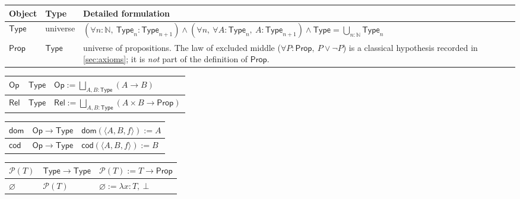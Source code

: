 \documentclass[11pt,reqno]{amsart}
\theoremstyle{blueplain}
\numberwithin{equation}{section}
\begin{document}
\label{sec:appendix-whole-predicates}%
\label{tab:whole-predicates}%
{\scriptsize
	\begin{tabular}{|m{5cm}|m{5cm}|m{8.3cm}|}
		\hline
		\textbf{Object} & \textbf{Type} & \textbf{Detailed formulation} \\ \hline
		$\mathsf{Type}$ & universe &
		$(\forall n:\mathbb{N},\ \mathsf{Type}_n:\mathsf{Type}_{n+1})
		\wedge(\forall n,\ \forall A:\mathsf{Type}_n,\ A:\mathsf{Type}_{n+1})
		\wedge\mathsf{Type}=\bigcup_{n:\mathbb{N}}\mathsf{Type}_n$ \\ \hline
		$\mathsf{Prop}$ & $\mathsf{Type}$ &
		universe of propositions.  The law of excluded middle
		($\forall P:\mathsf{Prop},\ P\vee\neg P$) is a classical hypothesis
		recorded in \cref{sec:axioms}; it is \emph{not} part of the definition
		of $\mathsf{Prop}$. \\ 
	\end{tabular}\noindent \newline
	\noindent
	\begin{tabular}{|m{5cm}|m{5cm}|m{8.3cm}|}
		\hline
		$\mathsf{Op}$ & $\mathsf{Type}$ &
		$\mathsf{Op}:=\bigsqcup_{A,B:\mathsf{Type}}(A\to B)$ \\ \hline
		$\mathsf{Rel}$ & $\mathsf{Type}$ &
		$\mathsf{Rel}:=\bigsqcup_{A,B:\mathsf{Type}}(A\times B\to\mathsf{Prop})$ \\
	\end{tabular}\noindent \newline
	\noindent
	\begin{tabular}{|m{5cm}|m{5cm}|m{8.3cm}|}
		\hline
		$\mathsf{dom}$ & $\mathsf{Op}\to\mathsf{Type}$ &
		$\mathsf{dom}(\langle A,B,f\rangle):=A$ \\ \hline
		$\mathsf{cod}$ & $\mathsf{Op}\to\mathsf{Type}$ &
		$\mathsf{cod}(\langle A,B,f\rangle):=B$ \\ 
	\end{tabular}\noindent \newline
	\noindent
	\begin{tabular}{|m{5cm}|m{5cm}|m{8.3cm}|}
		\hline
		$\mathcal{P}(T)$ & $\mathsf{Type}\to\mathsf{Type}$ &
		$\mathcal{P}(T):=T\to\mathsf{Prop}$ \\ \hline
		$\varnothing$ & $\mathcal{P}(T)$ &
		$\varnothing:=\lambda x:T,\ \bot$ \\ 
	\end{tabular}	\noindent \newline	\noindent
	\begin{tabular}{|m{5cm}|m{5cm}|m{8.3cm}|}

\end{tabular}}
\end{document}
